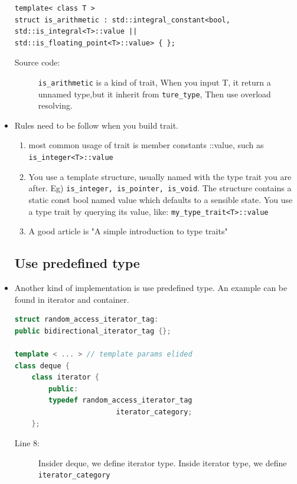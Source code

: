 \documentclass[a4paper,11pt,twoside]{book}
\begin{document}
\begin{itemize}
\begin{lstlisting}[numbers=none]
template< class T >
struct is_arithmetic : std::integral_constant<bool,
std::is_integral<T>::value ||
std::is_floating_point<T>::value> { };
\end{lstlisting}
\begin{description}
	\item[Source code:] \texttt{is\_arithmetic} is a kind of trait, When you input T, it return a unnamed type,but it inherit from \texttt{ture\_type}, Then use overload resolving.
\end{description}

	\item Rules need to be follow when you build trait.
	
	\begin{enumerate}
		\item most common usage of trait is member constants ::value, such as \texttt{is\_integer<T>::value}
		
		\item You use a template structure, usually named with the type trait you are after. Eg) \texttt{is\_integer, is\_pointer, is\_void}. The structure contains a static const bool named value which defaults to a sensible state. You use a type trait by querying its value, like: \texttt{my\_type\_trait<T>::value}
	
		\item A good article is "A simple introduction to type traits"
	\end{enumerate}

\subsection{Use predefined type}

\item Another kind of implementation is use predefined type. An example can be found in iterator and container.

\begin{lstlisting}[frame=single, language=c++]
struct random_access_iterator_tag: 
public bidirectional_iterator_tag {};

template < ... > // template params elided
class deque {
	class iterator {
		public:
		typedef random_access_iterator_tag 
						iterator_category;
	};		
\end{lstlisting}
\begin{description}
	\item[Line 8:] Insider deque, we define iterator type. Inside iterator type, we define \texttt{iterator\_category}
\end{description}


\end{itemize}
\end{document}

